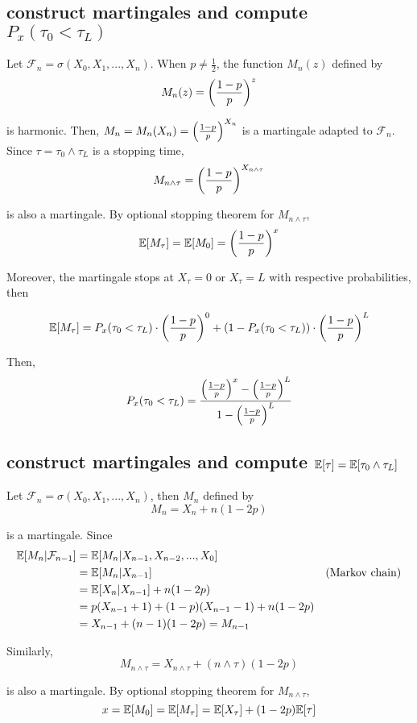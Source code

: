 \documentclass{article}
\begin{document}
\subsection{construct martingales and compute $P_x(\tau_0 < \tau_L)$}

Let $\mathcal{F}_n = \sigma(X_0, X_1, ..., X_n)$. When $p \neq \frac{1}{2}$, the function $M_n(z)$ defined by 
$$
	M_n(z) = \tuple*{\frac{1-p}{p}}^z
$$

is harmonic. Then, $M_n = M_n(X_n) =  \tuple*{\frac{1-p}{p}}^{X_n}$ is a martingale adapted to $\mathcal{F}_n$. Since $\tau = \tau_0 \wedge \tau_L$ is a stopping time,
$$
	M_{n \wedge \tau} = \tuple*{\frac{1-p}{p}}^{X_{n \wedge \tau}}
$$

is also a martingale. By optional stopping theorem for $M_{n \wedge \tau}$, 
$$
	\Exp[M_\tau] = \Exp[M_0] =  \tuple*{\frac{1-p}{p}}^x
$$

Moreover, the martingale stops at $X_\tau = 0$ or $X_\tau = L$ with respective probabilities, then

$$
	\Exp[M_\tau]  = P_x(\tau_0 < \tau_L) \cdot  \tuple*{\frac{1-p}{p}}^0 + (1 - P_x(\tau_0 < \tau_L)) \cdot  \tuple*{\frac{1-p}{p}}^L
$$

Then, 
$$
	P_x(\tau_0 < \tau_L) = \frac{\tuple*{\frac{1-p}{p}}^x - \tuple*{\frac{1-p}{p}}^L}{1 - \tuple*{\frac{1-p}{p}}^L}
$$

\subsection{construct martingales and compute $\Exp[\tau] = \Exp[\tau_0 \wedge \tau_L]$}

Let $\mathcal{F}_n = \sigma(X_0, X_1, ..., X_n)$, then $M_n$ defined by
$$
	M_n = X_n + n(1 - 2p)
$$

is a martingale. Since
\begin{align*}
	\Exp[M_n | \mathcal{F}_{n-1}]
	&= \Exp[M_n | X_{n-1}, X_{n-2}, ..., X_0] \\
	&= \Exp[M_n | X_{n-1}] &\text{(Markov chain)} \\
	&= \Exp[X_n | X_{n-1}] + n(1 - 2p) \\
	&= p(X_{n-1} + 1) + (1-p)(X_{n-1} - 1) + n(1 - 2p) \\
	&= X_{n-1} + (n-1)(1 - 2p) = M_{n-1}
\end{align*}

Similarly, 
$$
	M_{n \wedge \tau} = X_{n \wedge \tau} + (n \wedge \tau)(1 - 2p)
$$

is also a martingale. By optional stopping theorem for $M_{n \wedge \tau}$, 
$$
	x = \Exp[M_0] = \Exp[M_\tau] = \Exp[X_\tau] + (1-2p)\Exp[\tau]
$$
\end{document}
